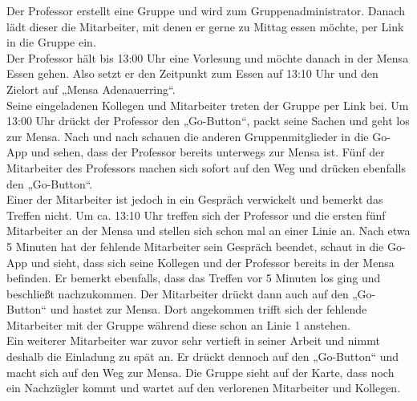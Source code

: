 
Der Professor erstellt eine Gruppe und wird zum Gruppenadministrator. Danach lädt dieser die Mitarbeiter, mit denen er gerne zu Mittag essen möchte, per Link in die Gruppe ein.\\
 Der Professor hält bis 13:00 Uhr eine Vorlesung und möchte danach in der Mensa Essen gehen. Also setzt er den Zeitpunkt zum Essen auf 13:10 Uhr und den Zielort auf „Mensa Adenauerring“. \\
 Seine eingeladenen Kollegen und Mitarbeiter treten der Gruppe per Link bei. Um 13:00 Uhr drückt der Professor den „Go-Button“, packt seine Sachen und geht los zur Mensa. Nach und nach schauen die anderen Gruppenmitglieder in die Go-App und sehen, dass der Professor bereits unterwegs zur Mensa ist. Fünf der Mitarbeiter des Professors machen sich sofort auf den Weg und drücken ebenfalls den „Go-Button“. \\
 Einer der Mitarbeiter ist jedoch in ein Gespräch verwickelt und bemerkt das Treffen nicht. Um ca. 13:10 Uhr treffen sich der Professor und die ersten fünf Mitarbeiter an der Mensa und stellen sich schon mal an einer Linie an. Nach etwa 5 Minuten hat der fehlende Mitarbeiter sein Gespräch beendet, schaut in die Go-App und sieht, dass sich seine Kollegen und der Professor bereits in der Mensa befinden. Er bemerkt ebenfalls, dass das Treffen vor 5 Minuten los ging und beschließt nachzukommen. Der Mitarbeiter drückt dann auch auf den „Go-Button“ und hastet zur Mensa. Dort angekommen trifft sich der fehlende Mitarbeiter mit der Gruppe während diese schon an Linie 1 anstehen. \\
 Ein weiterer Mitarbeiter war zuvor sehr vertieft in seiner Arbeit und nimmt deshalb die Einladung zu spät an. Er drückt dennoch auf den „Go-Button“ und macht sich auf den Weg zur Mensa. Die Gruppe sieht auf der Karte, dass noch ein Nachzügler kommt und wartet auf den verlorenen Mitarbeiter und Kollegen.\\